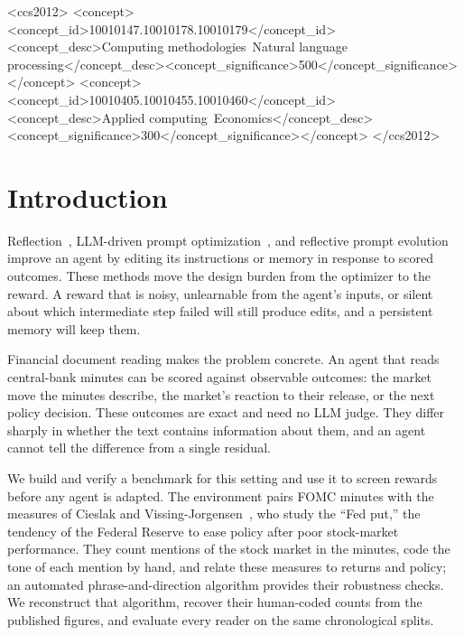 \documentclass[sigconf]{acmart}
\begin{document}
\begin{CCSXML}
<ccs2012>
<concept><concept_id>10010147.10010178.10010179</concept_id><concept_desc>Computing methodologies~Natural language processing</concept_desc><concept_significance>500</concept_significance></concept>
<concept><concept_id>10010405.10010455.10010460</concept_id><concept_desc>Applied computing~Economics</concept_desc><concept_significance>300</concept_significance></concept>
</ccs2012>
\end{CCSXML}


\maketitle

\section{Introduction}

Reflection~\cite{shinn2023reflexion}, LLM-driven prompt optimization~\cite{yang2024opro}, and reflective prompt evolution~\cite{agrawal2025gepa} improve an agent by editing its instructions or memory in response to scored outcomes. These methods move the design burden from the optimizer to the reward. A reward that is noisy, unlearnable from the agent's inputs, or silent about which intermediate step failed will still produce edits, and a persistent memory will keep them.

Financial document reading makes the problem concrete. An agent that reads central-bank minutes can be scored against observable outcomes: the market move the minutes describe, the market's reaction to their release, or the next policy decision. These outcomes are exact and need no LLM judge. They differ sharply in whether the text contains information about them, and an agent cannot tell the difference from a single residual.

We build and verify a benchmark for this setting and use it to screen rewards before any agent is adapted. The environment pairs FOMC minutes with the measures of Cieslak and Vissing-Jorgensen~\cite{cvj2021,cvj2020}, who study the ``Fed put,'' the tendency of the Federal Reserve to ease policy after poor stock-market performance. They count mentions of the stock market in the minutes, code the tone of each mention by hand, and relate these measures to returns and policy; an automated phrase-and-direction algorithm provides their robustness checks. We reconstruct that algorithm, recover their human-coded counts from the published figures, and evaluate every reader on the same chronological splits.
\end{document}
